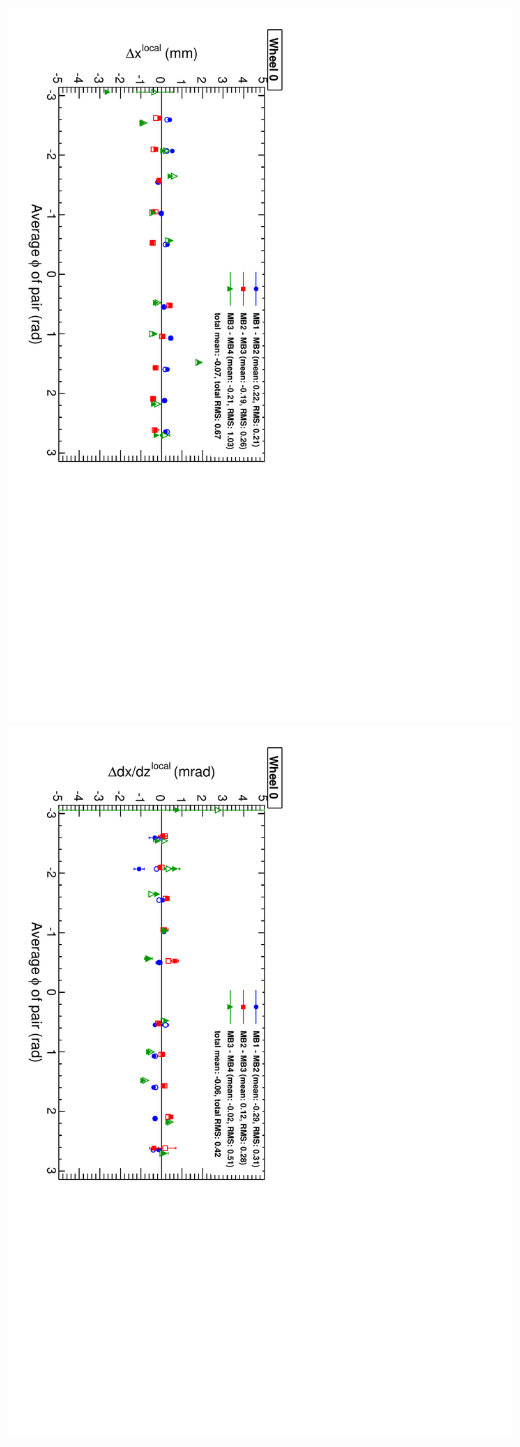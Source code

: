 \documentclass[compress]{beamer}
\begin{document}
\begin{frame}
\vspace{-0.1 cm}
\includegraphics[height=0.5\linewidth, angle=90]{NOV4_segdiff_x_whze.pdf}
\includegraphics[height=0.5\linewidth, angle=90]{NOV4_segdiff_dxdz_whze.pdf}
\end{frame}
\end{document}
